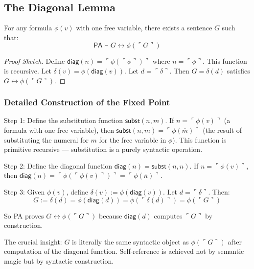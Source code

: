 \subsection{The Diagonal Lemma}
\label{sec:godel:diagonal}

\begin{lemma}
For any formula $\phi(v)$ with one free variable, there exists a sentence $G$ such that:
\[
\mathsf{PA} \vdash G \leftrightarrow \phi(\ulcorner G \urcorner)
\]
\end{lemma}

\begin{proof}[Proof Sketch]
Define $\mathsf{diag}(n) = \ulcorner \phi(\ulcorner \phi \urcorner) \urcorner$ where $n = \ulcorner \phi \urcorner$. This function is recursive. Let $\delta(v) = \phi(\mathsf{diag}(v))$. Let $d = \ulcorner \delta \urcorner$. Then $G = \delta(d)$ satisfies $G \leftrightarrow \phi(\ulcorner G \urcorner)$.
\end{proof}

\subsubsection*{Detailed Construction of the Fixed Point}

Step 1: Define the substitution function $\mathsf{subst}(n, m)$. If $n = \ulcorner \phi(v) \urcorner$ (a formula with one free variable), then $\mathsf{subst}(n, m) = \ulcorner \phi(\overline{m}) \urcorner$ (the result of substituting the numeral for $m$ for the free variable in $\phi$). This function is primitive recursive --- substitution is a purely syntactic operation.

Step 2: Define the diagonal function $\mathsf{diag}(n) = \mathsf{subst}(n, n)$. If $n = \ulcorner \phi(v) \urcorner$, then $\mathsf{diag}(n) = \ulcorner \phi(\ulcorner \phi(v) \urcorner) \urcorner = \ulcorner \phi(\overline{n}) \urcorner$.

Step 3: Given $\phi(v)$, define $\delta(v) := \phi(\mathsf{diag}(v))$. Let $d = \ulcorner \delta \urcorner$. Then:
\[
G := \delta(d) = \phi(\mathsf{diag}(d))
= \phi(\ulcorner \delta(d) \urcorner)
= \phi(\ulcorner G \urcorner)
\]

So PA proves $G \leftrightarrow \phi(\ulcorner G \urcorner)$ because $\mathsf{diag}(d)$ computes $\ulcorner G \urcorner$ by construction.

The crucial insight: $G$ is literally the same syntactic object as $\phi(\ulcorner G \urcorner)$ after computation of the diagonal function. Self-reference is achieved not by semantic magic but by syntactic construction.

